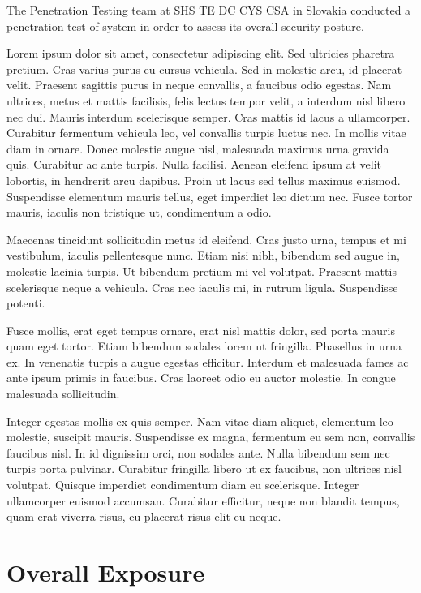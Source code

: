 
The Penetration Testing team at SHS TE DC CYS CSA in Slovakia conducted a penetration test of 
\textbf{\textsc{\ReportProjectName}} system in order to assess its overall security posture. 

Lorem ipsum dolor sit amet, consectetur adipiscing elit. Sed ultricies pharetra pretium. Cras varius purus eu cursus vehicula. Sed in molestie arcu, id placerat velit. Praesent sagittis purus in neque convallis, a faucibus odio egestas. Nam ultrices, metus et mattis facilisis, felis lectus tempor velit, a interdum nisl libero nec dui. Mauris interdum scelerisque semper. Cras mattis id lacus a ullamcorper. Curabitur fermentum vehicula leo, vel convallis turpis luctus nec. In mollis vitae diam in ornare. Donec molestie augue nisl, malesuada maximus urna gravida quis. Curabitur ac ante turpis. Nulla facilisi. Aenean eleifend ipsum at velit lobortis, in hendrerit arcu dapibus. Proin ut lacus sed tellus maximus euismod. Suspendisse elementum mauris tellus, eget imperdiet leo dictum nec. Fusce tortor mauris, iaculis non tristique ut, condimentum a odio.

Maecenas tincidunt sollicitudin metus id eleifend. Cras justo urna, tempus et mi vestibulum, iaculis pellentesque nunc. Etiam nisi nibh, bibendum sed augue in, molestie lacinia turpis. Ut bibendum pretium mi vel volutpat. Praesent mattis scelerisque neque a vehicula. Cras nec iaculis mi, in rutrum ligula. Suspendisse potenti.

Fusce mollis, erat eget tempus ornare, erat nisl mattis dolor, sed porta mauris quam eget tortor. Etiam bibendum sodales lorem ut fringilla. Phasellus in urna ex. In venenatis turpis a augue egestas efficitur. Interdum et malesuada fames ac ante ipsum primis in faucibus. Cras laoreet odio eu auctor molestie. In congue malesuada sollicitudin.

Integer egestas mollis ex quis semper. Nam vitae diam aliquet, elementum leo molestie, suscipit mauris. Suspendisse ex magna, fermentum eu sem non, convallis faucibus nisl. In id dignissim orci, non sodales ante. Nulla bibendum sem nec turpis porta pulvinar. Curabitur fringilla libero ut ex faucibus, non ultrices nisl volutpat. Quisque imperdiet condimentum diam eu scelerisque. Integer ullamcorper euismod accumsan. Curabitur efficitur, neque non blandit tempus, quam erat viverra risus, eu placerat risus elit eu neque. 

\pagebreak
\section*{Overall Exposure}